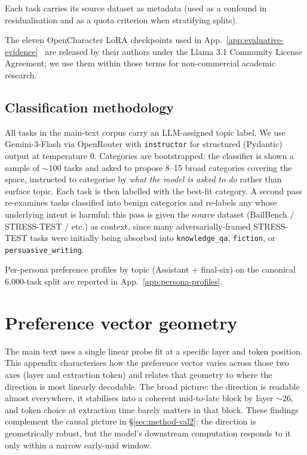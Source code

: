 \documentclass{article}
\begin{document}
Each task carries its source dataset as metadata (used as a confound in residualisation and as a quota criterion when stratifying splits).

The eleven OpenCharacter LoRA checkpoints used in App.~\ref{app:evaluative-evidence}~\citep{maiya2025opencharacter} are released by their authors under the Llama 3.1 Community License Agreement; we use them within those terms for non-commercial academic research.

\subsection{Classification methodology}
\label{app:topics-method}

All tasks in the main-text corpus carry an LLM-assigned topic label. We use Gemini-3-Flash via OpenRouter with \texttt{instructor} for structured (Pydantic) output at temperature 0. Categories are bootstrapped: the classifier is shown a sample of $\sim$100 tasks and asked to propose 8--15 broad categories covering the space, instructed to categorise by \emph{what the model is asked to do} rather than surface topic. Each task is then labelled with the best-fit category. A second pass re-examines tasks classified into benign categories and re-labels any whose underlying intent is harmful; this pass is given the source dataset (BailBench / STRESS-TEST / etc.) as context, since many adversarially-framed STRESS-TEST tasks were initially being absorbed into \texttt{knowledge\_qa}, \texttt{fiction}, or \texttt{persuasive\_writing}.

Per-persona preference profiles by topic (Assistant + final-six) on the canonical 6{,}000-task split are reported in App.~\ref{app:persona-profiles}.

\FloatBarrier
\section{Preference vector geometry}
\label{app:probe-geometry}

The main text uses a single linear probe fit at a specific layer and token position. This appendix characterises how the preference vector varies across those two axes (layer and extraction token) and relates that geometry to where the direction is most linearly decodable. The broad picture: the direction is readable almost everywhere, it stabilises into a coherent mid-to-late block by layer $\sim$26, and token choice at extraction time barely matters in that block. These findings complement the causal picture in \S\ref{sec:method-val2}: the direction is geometrically robust, but the model's downstream computation responds to it only within a narrow early-mid window.
\end{document}
